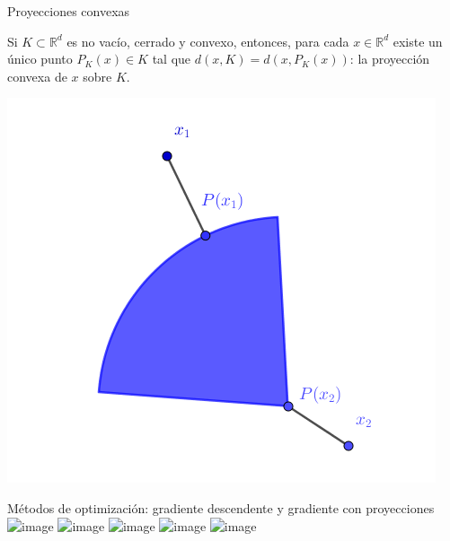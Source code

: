 \documentclass[10pt, compress]{beamer}
\newcommand\R{\mathbb{R}}
\begin{document}
\begin{frame}{Proyecciones convexas}
  \begin{theorem}
    Si $K \subset \R^d$ es no vacío, cerrado y convexo, entonces, para cada $x \in \R^d$ existe un único punto $P_K(x) \in K$ tal que $d(x,K) = d(x,P_K(x))$: la proyección convexa de $x$ sobre $K$.
  \end{theorem}
  \centering\includegraphics[height=0.5\textheight]{images/convex_projection.png}
\end{frame}

\begin{frame}{Métodos de optimización: gradiente descendente y gradiente con proyecciones}
  \centering\includegraphics<1-1>[width=\textwidth]{images/gradient1_lq.png}
  \centering\includegraphics<2-2>[width=\textwidth]{images/gradient2_lq.png}
  \centering\includegraphics<3-3>[width=\textwidth]{images/gradient3_lq.png}
  \centering\includegraphics<4-4>[width=\textwidth]{images/gradient4_lq.png}
  \centering\includegraphics<5-5>[width=\textwidth]{images/gradient5_lq.png}
\end{frame}

\end{document}

